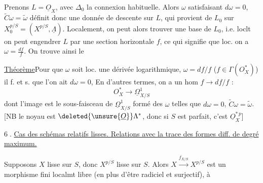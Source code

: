  Prenons $L=\underline O_X$, avec $\Delta_0$ la connexion habituelle. Alors $\omega$ satisfaisant $d\omega=0$, $\widetilde C\omega=\widetilde\omega$ définit donc une donnée de descente sur $L$, qui  provient de $L_0$ sur $X_0^{p/S}=(X^{p/S},\underline\Lambda)$. Localement, on peut alors  trouver une base de $L_0$, i.e. loclt on peut engendrer $L$ par une section horizontale $f$, ce qui signifie que loc. on a $\omega=\frac{df}{f}$. On trouve ainsi le

\uline{Théorème}\quad Pour que  $\omega$ soit loc. une dérivée logarithmique, $\omega=df/f$ ($f\in\Gamma(O_X^*)$) il f. et s. que l'on ait $d\omega=0$,  En d'autres termes, on a un hom $f\longrightarrow df/f$ :
\[
 O_X^*\longrightarrow\underline\Omega^1_{X/S}
\]
dont l'image est le sous-faisceau de $\underline\Omega^1_{X/S}$ formé des $\omega$ telles que $d\omega=0$, $\widetilde C\omega=\widetilde\omega$. [NB le noyau est $\deleted{\unsure{\underline O}}\Lambda^*$, donc si $S$ est parfait, c'est $\underline O_X^{*\,p}$]

\textcircled{6.} \uline{Cas des schémas relatifs lisses. Relations avec la trace des formes diff. de degré maximum.}

Supposons $X$ lisse sur $S$, donc $X^{p/S}$ lisse sur $S$. Alors $X\xrightarrow{f_{X/S}}X^{p/S}$ est un morphisme fini localmt libre (en plus d'être radiciel et surjectif), à

